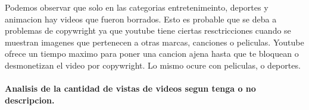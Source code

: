             \begin{figure}[ht]
            \end{figure}
        \FloatBarrier
        Podemos observar que solo en las categorias entretenimeinto, deportes y
        animacion hay videos que fueron borrados. Esto es probable que se deba a
        problemas de copywright ya que youtube tiene ciertas resctricciones cuando
        se muestran imagenes que pertenecen a otras marcas, canciones o peliculas.
        Youtube ofrece un tiempo maximo para poner una cancion ajena hasta que te
        bloquean o desmonetizan el video por copywright. Lo mismo ocure con peliculas,
        o deportes.

        \newpage
        \paragraph{Analisis de la cantidad de vistas de videos segun tenga o no descripcion.}


